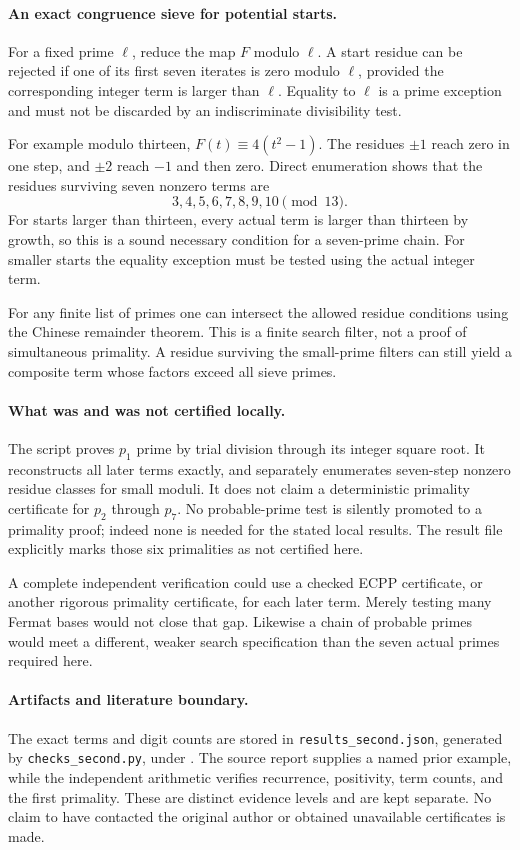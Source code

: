 \documentclass[11pt,a4paper]{article}
\begin{document}
\paragraph{An exact congruence sieve for potential starts.}
For a fixed prime $\ell$, reduce the map $F$ modulo $\ell$.
A start residue can be rejected if one of its first seven iterates
is zero modulo $\ell$, provided the corresponding integer term is
larger than $\ell$. Equality to $\ell$ is a prime exception and must
not be discarded by an indiscriminate divisibility test.

For example modulo thirteen,
$F(t)\equiv4(t^2-1)$. The residues $\pm1$ reach zero in one step,
and $\pm2$ reach $-1$ and then zero. Direct enumeration shows that
the residues surviving seven nonzero terms are
\[
                          3,4,5,6,7,8,9,10\pmod{13}.
\]
For starts larger than thirteen, every actual term is larger than
thirteen by growth, so this is a sound necessary condition for a
seven-prime chain. For smaller starts the equality exception must be
tested using the actual integer term.

For any finite list of primes one can intersect the allowed residue
conditions using the Chinese remainder theorem. This is a finite
search filter, not a proof of simultaneous primality. A residue
surviving the small-prime filters can still yield a composite term
whose factors exceed all sieve primes.

\paragraph{What was and was not certified locally.}
The script proves $p_1$ prime by trial division through its integer
square root. It reconstructs all later terms exactly, and separately
enumerates seven-step nonzero residue classes for small moduli. It
does not claim a deterministic primality certificate for $p_2$ through
$p_7$. No probable-prime test is silently promoted to a primality
proof; indeed none is needed for the stated local results. The result
file explicitly marks those six primalities as not certified here.

A complete independent verification could use a checked ECPP
certificate, or another rigorous primality certificate, for each
later term. Merely testing many Fermat bases would not close that gap.
Likewise a chain of probable primes would meet a different, weaker
search specification than the seven actual primes required here.

\paragraph{Artifacts and literature boundary.}
The exact terms and digit counts are stored in
\texttt{results\_second.json}, generated by
\texttt{checks\_second.py}, under
.
The source report supplies a named prior example, while the independent
arithmetic verifies recurrence, positivity, term counts, and the first
primality. These are distinct evidence levels and are kept separate.
No claim to have contacted the original author or obtained unavailable
certificates is made.
\end{document}
